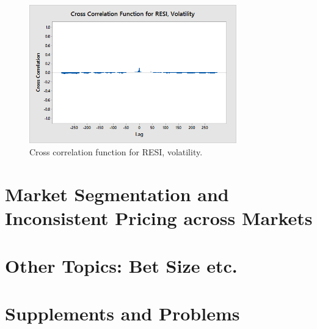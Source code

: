 \begin{figure}[!ht]
   \centering
    \includegraphics[width=0.8\textwidth]{chapters/chapter_stat_ts/figures/resivol.png}
   \caption{Cross correlation function for RESI, volatility. \label{fig:ccresi}}
\end{figure}






\newpage



\section{Market Segmentation and Inconsistent Pricing across Markets}

\section{Other Topics: Bet Size etc.}

\section{Supplements and Problems}


